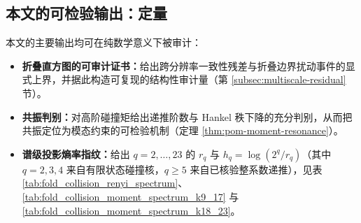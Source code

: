 \subsection{本文的可检验输出：定量}
本文的主要输出均可在纯数学意义下被审计：
\begin{itemize}
  \item \textbf{折叠直方图的可审计证书：}给出跨分辨率一致性残差与折叠边界扰动事件的显式上界，并据此构造可复现的结构性审计量（第 \ref{subsec:multiscale-residual} 节）。
  \item \textbf{共振判别：}对高阶碰撞矩给出递推阶数与 Hankel 秩下降的充分判别，从而把共振定位为模态约束的可检验机制（定理 \ref{thm:pom-moment-resonance}）。
  \item \textbf{谱级投影熵率指纹：}给出 \(q=2,\dots,23\) 的 \(r_q\) 与 \(h_q=\log(2^q/r_q)\)（其中 \(q=2,3,4\) 来自有限状态碰撞核，\(q\ge 5\) 来自已核验整系数递推），见表 \ref{tab:fold_collision_renyi_spectrum}、\ref{tab:fold_collision_moment_spectrum_k9_17} 与 \ref{tab:fold_collision_moment_spectrum_k18_23}。
\end{itemize}

